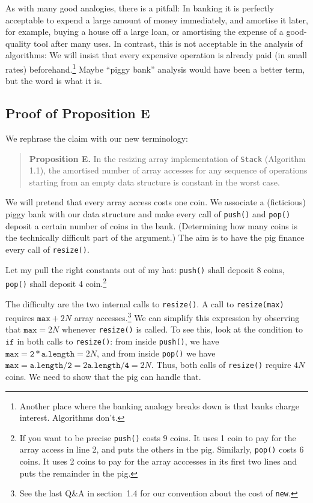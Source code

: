 \documentclass{tufte-handout}
\begin{document}
As with many good analogies, there is a pitfall: 
In banking it is perfectly acceptable to expend a large amount of
money immediately, and amortise it later, for example, buying a house
off a large loan, or amortising the expense of a good-quality tool
after many uses.
In contrast, this is not acceptable in the analysis of algorithms:
We will insist that every expensive operation is already paid (in
small rates) beforehand.\footnote{Another place where the banking
  analogy breaks down is that banks charge interest. Algorithms don't.}
Maybe ``piggy bank'' analysis would have been a better term, but the
word is what it is.


\subsection*{Proof of Proposition E}

We rephrase the claim with our new terminology:

   
\begin{quote}{\bf\sf Proposition E.} 
  In the resizing array implementation of {\tt Stack} (Algorithm 1.1),
  the amortised number of array accesses for any sequence of
  operations starting from an empty data structure is constant in the
  worst case. 
\end{quote}

We will pretend that every array access costs one coin.  We associate
a (ficticious) piggy bank with our data structure and make every call
of {\tt push()} and {\tt pop()} deposit a certain number of coins in
the bank. (Determining how many coins is the technically difficult
part of the argument.) 
The aim is to have the pig finance every call of {\tt resize()}.

Let my pull the right constants out of my hat: {\tt push()} shall
deposit 8 coins, {\tt pop()} shall deposit 4 coin.\footnote{If you
  want to be precise {\tt push()} costs 9 coins. It uses 1 coin to pay
  for the array access in line 2, and puts the others in the
  pig. Similarly, {\tt pop()} costs 6 coins. It uses 2 coins to pay
  for the array acccesses in its first two lines and puts the
  remainder in the pig.}

The difficulty are the two internal calls to {\tt resize()}.  A call
to {\tt resize(max)} requires $\mathtt{max}+ 2N$ array
accesses.\footnote{See the last Q\&A in section~1.4 for our convention
  about the cost of {\tt new}.}  We can simplify this expression by
observing that $\mathtt{max}=2N$ whenever {\tt resize()} is called. To
see this, look at the condition to $\mathtt{if}$ in both calls
to \texttt{resize()}: from inside \texttt{push()}, we have
$\mathtt{max}= \mathtt{2*a.length} = 2N$, and from inside
\texttt{pop()} we have $\mathtt{max}= \mathtt{a.length/2}= 2
\mathtt{a.length/4} = 2N$. Thus, both calls of {\tt resize()} require
$4N$ coins. We need to show that the pig can handle that.
\end{document}
